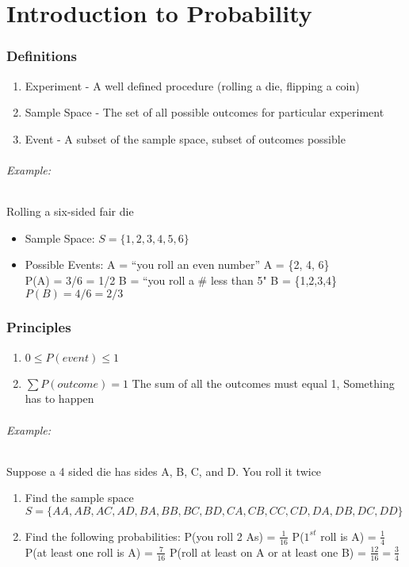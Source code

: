 \documentclass[11pt]{article}
\begin{document}
    \part[Introduction to Probability]{Introduction to Probability}
    \label{null:introduction-to-probability}
    \section[Definitions]{Definitions}
    \begin{enumerate}
        \item Experiment - A well defined procedure (rolling a die, flipping a coin)
        \item Sample Space - The set of all possible outcomes for particular experiment
        \item Event - A subset of the sample space, subset of outcomes possible
    \end{enumerate}

    \paragraph[Example]{Example: } Rolling a six-sided fair die

    \begin{itemize}
        \item Sample Space: $S = \{1, 2, 3, 4, 5, 6\}$
        \item Possible Events:
        \subitem \textmd{A = ``you roll an even number'' A = \{2, 4, 6\}\\
        P(A) = 3/6 = 1/2}
        \subitem \textmd{B = ``you roll a \# less than 5" \to B = \{1,2,3,4\}
        \subitem $P(B) = 4/6 = 2/3 $}
    \end{itemize}
    \section[Principles]{Principles}
    \label{sec:principles}
    \begin{enumerate}
        \item $0\leq P(event) \leq 1$
        \item $\sum P(outcome) = 1$ The sum of all the outcomes must equal 1,
        Something has to happen
    \end{enumerate}

    \paragraph[Example]{Example: } Suppose a 4 sided die has sides A, B, C, and D.
    You roll it twice
    \begin{enumerate}
        \item Find the sample space \\
        $S = \{AA, AB, AC, AD, BA, BB, BC, BD, CA, CB, CC, CD, DA, DB, DC, DD\}$
        \item Find the following probabilities:
        \subitem P(you roll 2 As) = $\frac{1}{16}$
        \subitem P($1^{st}$ roll is A) = $\frac{1}{4}$
        \subitem P(at least one roll is A) = $\frac{7}{16}$
        \subitem P(roll at least on A or at least one B) = $\frac{12}{16} = \frac{3}{4}$
    \end{enumerate}
\end{document}
